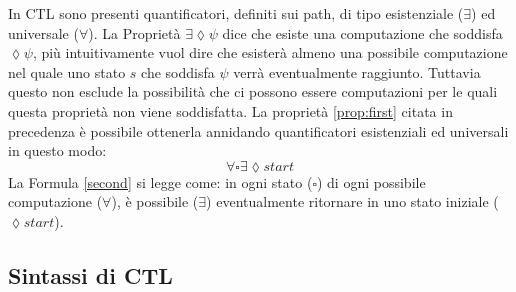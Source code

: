 \documentclass{article}
\begin{document}
In \ac{CTL} sono presenti quantificatori, definiti sui path, di tipo esistenziale ($\exists$) ed universale ($\forall$). La Proprietà $\exists\lozenge \psi$ dice che esiste una computazione che soddisfa $\lozenge\psi$, più intuitivamente vuol dire che esisterà almeno una possibile computazione nel quale uno stato $s$ che soddisfa $\psi$ verrà eventualmente raggiunto. Tuttavia questo non esclude la possibilità che ci possono essere computazioni per le quali questa proprietà non viene soddisfatta.
La proprietà \ref{prop:first} citata in precedenza è possibile ottenerla annidando quantificatori esistenziali ed universali in questo modo:
\begin{equation}
\label{second}
\forall\square\exists\lozenge start
\end{equation}
La Formula \eqref{second} si legge come: in ogni stato ($\square$) di ogni possibile computazione ($\forall$), è possibile ($\exists$) eventualmente ritornare in uno stato iniziale ($\lozenge start$).


\subsection{Sintassi di \ac{CTL}} 


\begin{acronym}
\end{acronym}
\end{document}
